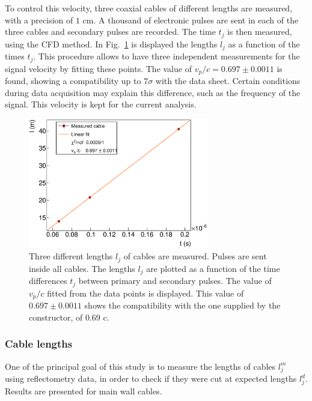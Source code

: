 To control this velocity, three coaxial cables of different lengths are measured, with a precision of $1$ cm.
A thousand of electronic pulses are sent in each of the three cables and secondary pulses are recorded.
The time $t_{j}$ is then measured, using the CFD method.
In Fig.~\ref{fig:celerity} is displayed the lengths $l_{j}$ as a function of the times $t_{j}$.
This procedure allows to have three independent measurements for the signal velocity by fitting these points.
The value of $v_{p}/c = 0.697\pm 0.0011$ is found, showing a compatibility up to $7\sigma$ with the data sheet.
Certain conditions during data acquisition may explain this difference, such as the frequency of the signal.
This velocity is kept for the current analysis.
\begin{figure}[h!]
  \centering
  \includegraphics[width=0.7\textwidth]{commissioning/fig_commissioning/celerity.eps}
  \caption{Three different lengths $l_{j}$ of cables are measured.
    Pulses are sent inside all cables.
    The lengths $l_{j}$ are plotted as a function of the time differences $t_{j}$ between primary and secondary pulses.
    The value of $v_{p}/c$ fitted from the data points is displayed.
    This value of $0.697\pm 0.0011$ shows the compatibility with the one supplied by the constructor, of $0.69$ c.
    \label{fig:celerity}}
\end{figure}

\subsubsection*{Cable lengths}

One of the principal goal of this study is to measure the lengths of cables $l^{m}_{j}$ using reflectometry data, in order to check if they were cut at expected lengths $l^{d}_{j}$.
Results are presented for main wall cables.

